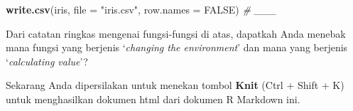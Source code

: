 \documentclass[]{article}
\newenvironment{Shaded}{\begin{snugshade}}{\end{snugshade}}
\newcommand{\CommentTok}[1]{\textcolor[rgb]{0.56,0.35,0.01}{\textit{#1}}}
\newcommand{\DataTypeTok}[1]{\textcolor[rgb]{0.13,0.29,0.53}{#1}}
\newcommand{\KeywordTok}[1]{\textcolor[rgb]{0.13,0.29,0.53}{\textbf{#1}}}
\newcommand{\NormalTok}[1]{#1}
\newcommand{\OtherTok}[1]{\textcolor[rgb]{0.56,0.35,0.01}{#1}}
\newcommand{\StringTok}[1]{\textcolor[rgb]{0.31,0.60,0.02}{#1}}
\begin{document}
\begin{Shaded}
\begin{Highlighting}[]
\KeywordTok{write.csv}\NormalTok{(iris, }\DataTypeTok{file =} \StringTok{"iris.csv"}\NormalTok{, }\DataTypeTok{row.names =} \OtherTok{FALSE}\NormalTok{) }\CommentTok{# ___}
\end{Highlighting}
\end{Shaded}

Dari catatan ringkas mengenai fungsi-fungsi di atas, dapatkah Anda
menebak mana fungsi yang berjenis `\emph{changing the environment}' dan
mana yang berjenis `\emph{calculating value}'?

Sekarang Anda dipersilakan untuk menekan tombol \textbf{Knit} (Ctrl +
Shift + K) untuk menghasilkan dokumen html dari dokumen R Markdown ini.
\end{document}
